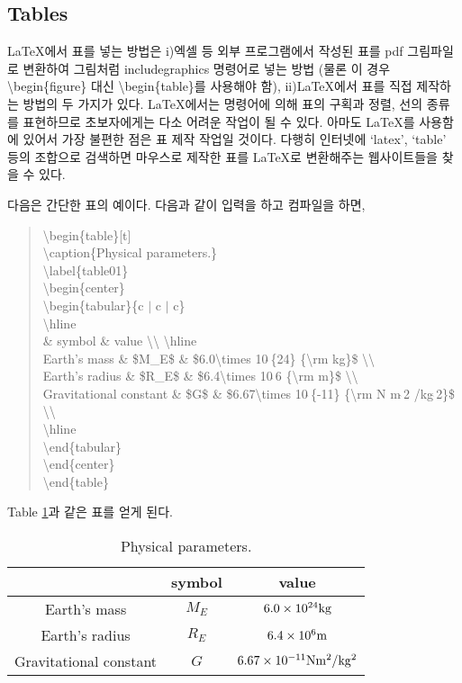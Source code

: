 \documentclass{gshs-report-v1.1}
\begin{document}
\subsection{Tables}

\LaTeX 에서 표를 넣는 방법은 i)엑셀 등 외부 프로그램에서 작성된 표를 pdf 그림파일로 변환하여 그림처럼 includegraphics 명령어로 넣는 방법 (물론 이 경우 {\textbackslash}begin\{figure\} 대신 {\textbackslash}begin\{table\}를 사용해야 함), ii)\LaTeX 에서 표를 직접 제작하는 방법의 두 가지가 있다. \LaTeX 에서는 명령어에 의해 표의 구획과 정렬, 선의 종류를 표현하므로 초보자에게는 다소 어려운 작업이 될 수 있다. 아마도 \LaTeX 를 사용함에 있어서 가장 불편한 점은 표 제작 작업일 것이다. 다행히 인터넷에 `latex', `table' 등의 조합으로 검색하면 마우스로 제작한 표를 \LaTeX 로 변환해주는 웹사이트들을 찾을 수 있다.

다음은 간단한 표의 예이다. 다음과 같이 입력을 하고 컴파일을 하면,
\begin{quote}
	{\textbackslash}begin\{table\}[t]\\
	{\textbackslash}caption\{Physical parameters.\}\\
	{\textbackslash}label\{table01\}\\
	{\textbackslash}begin\{center\}\\
	{\textbackslash}begin\{tabular\}\{c $|$ c $|$ c\}\\
	{\textbackslash}hline\\
	\& symbol \& value {\textbackslash}{\textbackslash} {\textbackslash}hline \\
	Earth's mass \& \$M\_E\$ \& \$6.0{\textbackslash}times 10$\hat{\ }$\{24\} \{{\textbackslash}rm kg\}\$ {\textbackslash}{\textbackslash}\\
	Earth's radius \& \$R\_E\$ \& \$6.4{\textbackslash}times 10$\hat{\ }$6 \{{\textbackslash}rm m\}\$ {\textbackslash}{\textbackslash}\\
	Gravitational constant \& \$G\$ \& \$6.67{\textbackslash}times 10$\hat{\ }$\{-11\} \{{\textbackslash}rm N m$\hat{\ }$2 /kg$\hat{\ }$2\}\$ {\textbackslash}{\textbackslash} \\
	{\textbackslash}hline\\
	{\textbackslash}end\{tabular\}\\
	{\textbackslash}end\{center\}\\
	{\textbackslash}end\{table\}
\end{quote}
Table \ref{table01}과 같은 표를 얻게 된다.
\begin{table}[t]
	\caption{Physical parameters.} \label{table01}
	\begin{center}
		\begin{tabular}{c|c|c}
			\hline
			& symbol & value \\ \hline
			Earth's mass & $M_E$ & $6.0\times 10^{24} {\rm kg}$ \\
			Earth's radius & $R_E$ & $6.4\times 10^6 {\rm m}$ \\
			Gravitational constant & $G$ & $6.67\times 10^{-11} {\rm N m^2 /kg^2}$ \\ \hline
		\end{tabular}
	\end{center}
\end{table}
\end{document}

